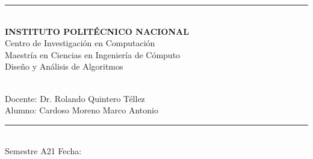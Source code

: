 \begin{titlepage}
\begin{center}
        \vspace*{2mm}
        \rule{\textwidth}{1.5pt}\\
        \vspace*{5mm}
        \textbf{\Large INSTITUTO POLITÉCNICO NACIONAL}\\
        \vspace*{8mm}
        {\Large Centro de Investigación en Computación}\\
        \vspace{8mm}
        {\Large Maestría en Ciencias en Ingeniería de Cómputo}\\
        \vspace{19mm}
        {\Large Diseño y Análisis de Algoritmos}\\
        \vspace{49mm}




        \textbf{\large \tarea}\\





        \vspace*{48mm}
        {\large Docente: Dr. Rolando Quintero Téllez}\\
        \vspace*{20mm}
        {\large Alumno: Cardoso Moreno Marco Antonio}\\
        \vspace*{10mm}
        \rule{\textwidth}{1.5pt}\\
        {\large Semestre A21} \hfill {\large Fecha: \fecha}
    \end{center}
\end{titlepage}

